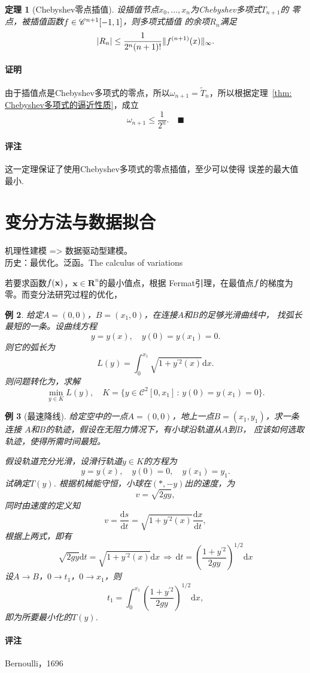 \documentclass[12pt, a4paper]{article}
\theoremstyle{margin}
\newtheorem{thm}{定理}
\newtheorem{exa}[thm]{例}
\newcommand{\pr}{\prime}
\newcommand{\ms}{\mathscr}
\newcommand{\mbf}{\mathbf}
\newcommand{\f}{\mathnormal{f}}
\newcommand{\R}{\mathbf{R}}
\newcommand{\rd}{\mathrm{d}}
\newcommand\thmref[1]{定理~\ref{#1}}
\newcommand{\remark}{\paragraph{评注}}
\newcommand{\proof}{\paragraph{证明}}
\begin{document}
  \begin{thm}[Chebyshev零点插值]
    设插值节点$x_0,\dots,x_n$为Chebyshev多项式$T_{n+1}$的
    零点，被插值函数$\f\in\ms{C}^{n+1}[-1, 1]$，则多项式插值
    的余项$R_n$满足
    \[
      |R_n| \le \frac{1}{2^n(n+1)!}\|\f^{(n+1)}(x)\|_{\infty}.
    \]
  \end{thm}
  \proof
    由于插值点是Chebyshev多项式的零点，所以$\omega_{n+1}=
    \widetilde{T}_n$，所以根据\thmref{thm: Chebyshev多项式的逼近性质}，成立
    \[
      \omega_{n+1} \le \frac{1}{2^n}.\quad\blacksquare
    \]
  \remark
    这一定理保证了使用Chebyshev多项式的零点插值，至少可以使得
    误差的最大值最小.

\newpage
\section{变分方法与数据拟合}
  机理性建模 => 数据驱动型建模。\\
  历史：最优化。泛函。The calculus of variations\par

    若要求函数$\f(\mbf{x})$，$\mbf{x}\in\R^n$的最小值点，根据
    Fermat引理，在最值点$\f$的梯度为零。而变分法研究过程的优化，
  \begin{exa}
    给定$A=(0,0)$，$B=(x_1,0)$，在连接$A$和$B$的足够光滑曲线中，
    找弧长最短的一条。设曲线方程
    \[
      y=y(x),\quad y(0) = y(x_1) = 0.
    \]
    则它的弧长为
    \[
      L(y) = \int_0^{x_1} \sqrt{1+y^{\pr2}(x)}\rd x.
    \]
    则问题转化为，求解
    \[
      \min_{y\in K} L(y),\quad K = \{y\in\ms{C}^2[0,x_1]\,:\,
      y(0) = y(x_1) = 0\}.
    \]
  \end{exa}

  \begin{exa}[最速降线]
    给定空中的一点$A=(0,0)$，地上一点$B=(x_1,y_1)$，求一条连接
    $A$和$B$的轨迹，假设在无阻力情况下，有小球沿轨道从$A$到$B$，
    应该如何选取轨迹，使得所需时间最短。\par
    假设轨道充分光滑，设滑行轨道$y\in K$的方程为
    \[
      y=y(x), \quad y(0)=0,\quad y(x_1) = y_1.
    \]
    试确定$T(y)$. 根据机械能守恒，小球在$(*,-y)$出的速度，为
    \[
      v = \sqrt{2gy},
    \]
    同时由速度的定义知
    \[
      v = \frac{\rd s}{\rd t} = \sqrt{1+y^{\pr2}(x)}\frac{\rd x}{\rd t},
    \]
    根据上两式，即有
    \[
      \sqrt{2gy}\rd t = \sqrt{1+y^{\pr2}(x)}\rd x \,\Rightarrow\,
      \rd t = \left( \frac{1+y^{\pr2}}{2gy} \right)^{1/2}\rd x
    \]
    设$A\to B$，$0\to t_1$，$0\to x_1$，则
    \[
      t_1 = \int_0^{x_1} \left( \frac{1+y^{\pr2}}{2gy} \right)^{1/2}\rd x,
    \]
    即为所要最小化的$T(y)$.
  \end{exa}
  \remark
    Bernoulli，1696
\end{document}
